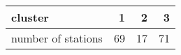 \begin{tabular}{lrrr}
\toprule
cluster &   1 &   2 &   3 \\
\midrule
number of stations &  69 &  17 &  71 \\
\bottomrule
\end{tabular}
